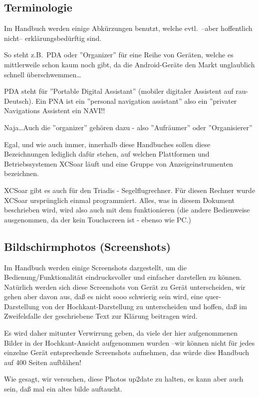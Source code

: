 \subsection*{Terminologie}
Im Handbuch werden einige Abkürzungen benutzt, welche evtl.\ --aber hoffentlich nicht--  erklärungsbedürftig sind.

So  steht z.B.\  PDA oder ''Organizer'' für eine Reihe von Geräten, welche es mittlerweile schon kaum noch 
gibt, da die Android-Geräte den Markt unglaublich schnell überschwemmen\dots  

PDA steht für ''Portable Digital Assistant'' (mobiler digitaler Assistent auf rau-Deutsch). 
Ein PNA ist ein ''personal navigation assistant'' also ein ''privater Navigations Assistent ein NAVI!!

Naja\dots Auch die ''organizer'' gehören dazu - also ''Aufräumer'' oder ''Organisierer'' 
 
Egal, und wie auch immer, innerhalb diese Handbuches sollen diese Bezeichnungen lediglich dafür stehen, 
auf welchen Plattformen und Betriebssystemen \textsf{XCSoar} läuft und eine Gruppe von Anzeigeinstrumenten bezeichnen. 

\textsf{XCSoar} gibt es auch für den Triadis \al - Segelflugrechner. 
Für diesen Rechner wurde \textsf{XCSoar} ursprünglich einmal programmiert. Alles, was in diesem Dokument beschrieben wird, wird also auch 
mit dem \al funktionieren (die andere Bedienweise ausgenommen, da der \al kein Touchscreen ist - ebenso wie PC.)

\subsection*{Bildschirmphotos (Screenshots)}

Im Handbuch werden einige Screenshots dargestellt, um die Bedienung/Funktionalität eindrucksvoller und einfacher darstellen zu können.
Natürlich werden sich diese Screenshots von Gerät zu Gerät unterscheiden, wir gehen aber davon aus, daß es nicht sooo 
schwierig sein wird, eine quer-Darstellung  von der Hochkant-Darstellung zu unterscheiden und hoffen, daß im Zweifelsfalle der geschriebene
Text zur Klärung  beitragen wird. 

Es wird daher mitunter Verwirrung geben, da viele der hier aufgenommenen Bilder in der Hochkant-Ansicht aufgenommen wurden 
--wir können nicht für jedes einzelne Gerät entsprechende Screenshots aufnehmen, das würde dies Handbuch auf 400 Seiten aufblähen! 

Wie gesagt, wir versuchen, diese Photos up2date zu halten, es kann aber auch sein, daß mal ein altes bilde auftaucht.


